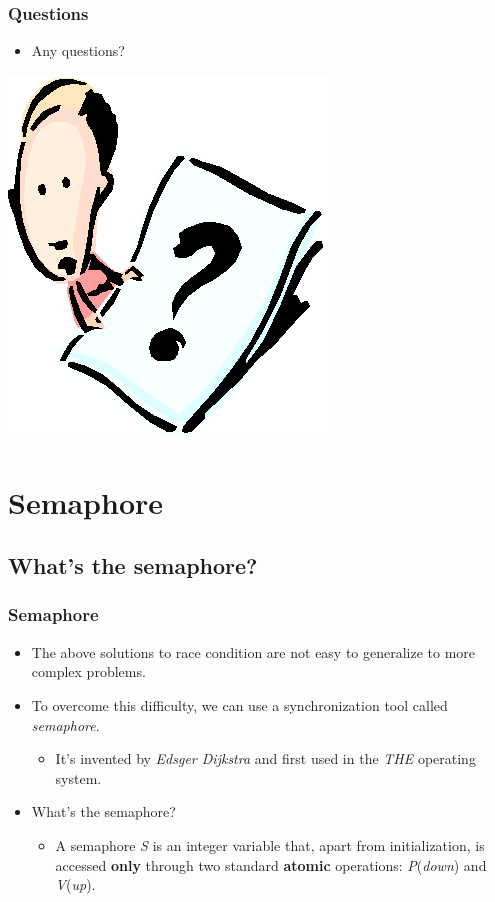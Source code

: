 \documentclass[CJKutf8,xcolor=pdftex,dvipsnames,table]{beamer}
\begin{document}
\begin{CJK*}{UTF8}{song}
  \begin{frame}
  \frametitle{Questions}
  \begin{itemize}
  \item{Any questions?}
  \end{itemize}
  \begin{center}
    \includegraphics[scale=.5]{question}
  \end{center}
  \end{frame}

\section{Semaphore}

\subsection{What's the semaphore?}

  \begin{frame}
  \frametitle{Semaphore} \pause
  \begin{itemize}
  \item{The above solutions to race condition are not easy to generalize to more complex problems.} \pause
  \item{To overcome this difficulty, we can use a synchronization tool called \emph{semaphore}.} \pause
    \begin{itemize}
    \item{It's invented by \textit{Edsger Dijkstra} and first used in the \emph{THE} operating system.} \pause
    \end{itemize}
  \item{What's the semaphore?} \pause
    \begin{itemize}
    \item{A semaphore \emph{S} is an integer variable that, apart from
      initialization, is accessed \textbf{only} through two standard \textbf{atomic} operations: \emph{P}(\emph{down}) and \emph{V}(\emph{up}).}
    \end{itemize}
  \end{itemize}
  \end{frame}


\end{CJK*}
\end{document}
